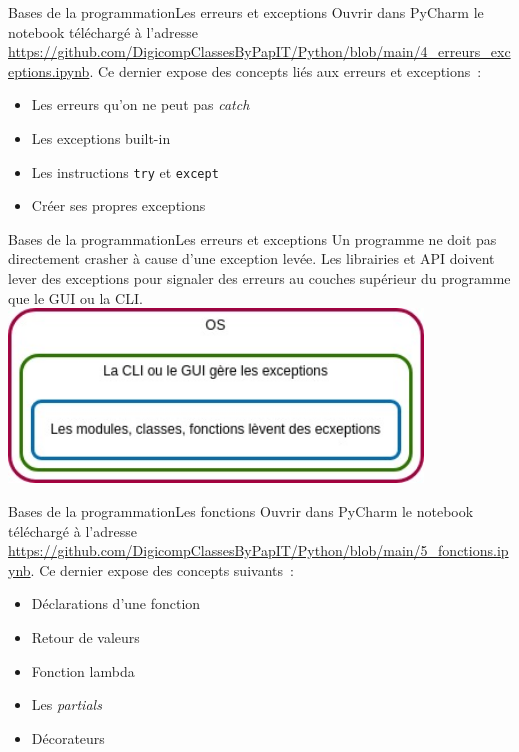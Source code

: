 \documentclass{beamer}
\begin{document}
    \begin{frame}{Bases de la programmation}{Les erreurs et exceptions}
        Ouvrir dans PyCharm le notebook téléchargé à l'adresse \url{https://github.com/DigicompClassesByPapIT/Python/blob/main/4_erreurs_exceptions.ipynb}.
        \bigbreak
        Ce dernier expose des concepts liés aux erreurs et exceptions~:
        \begin{itemize}
            \item Les erreurs qu'on ne peut pas \textit{catch}
            \item Les exceptions built-in
            \item Les instructions \lstinline{try} et \lstinline{except}
            \item Créer ses propres exceptions
        \end{itemize}
    \end{frame}

    \begin{frame}{Bases de la programmation}{Les erreurs et exceptions}
        Un programme ne doit pas directement crasher à cause d'une exception levée.
        Les librairies et API doivent lever des exceptions pour signaler des erreurs au couches supérieur du programme que le GUI ou la CLI.
        \bigbreak
        \centering
        \includegraphics[width=11cm]{image/exception}
    \end{frame}

    \begin{frame}{Bases de la programmation}{Les fonctions}
        Ouvrir dans PyCharm le notebook téléchargé à l'adresse \url{https://github.com/DigicompClassesByPapIT/Python/blob/main/5_fonctions.ipynb}.
        \bigbreak
        Ce dernier expose des concepts suivants~:
        \begin{itemize}
            \item Déclarations d'une fonction
            \item Retour de valeurs
            \item Fonction lambda
            \item Les \textit{partials}
            \item Décorateurs
        \end{itemize}
    \end{frame}
\end{document}
